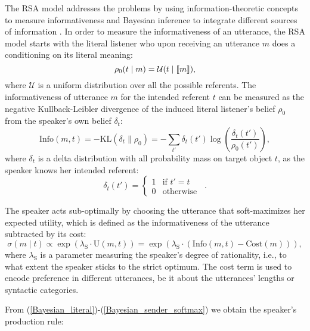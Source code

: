 The RSA model addresses the problems by using information-theoretic
concepts to measure informativeness and Bayesian inference to
integrate different sources of information
\cite{Frank2009,Frank,Bergen2012,GoodmanStuhlmuller2013:Knowledge-and-I}. In
order to measure the informativeness of an utterance, the RSA model
starts with the literal listener who upon receiving an utterance $m$
does a conditioning on its literal meaning:
\begin{equation}\label{Bayesian_literal}
\rho_0(t \mid m) = \mathcal{U}(t\mid \llbracket m \rrbracket) ,
\end{equation}
where $\mathcal{U}$ is a uniform distribution over all the possible
referents. The informativeness of utterance $m$ for the intended
referent $t$ can be measured as the negative Kullback-Leibler
divergence of the induced literal listener's belief $\rho_0$ from the
speaker's own belief $\delta_t$:
\begin{equation} \label{Bayesian_sender_informativeness}
\mbox{Info}(m,t)=-\mbox{KL}(\delta_t \| \rho_0)=-\sum_{t'}\delta_t(t')\log\left(\frac{\delta_t(t')}{\rho_0(t')}\right),
\end{equation}
where $\delta_t$ is a delta distribution with all probability mass on
target object $t$, as the speaker knows her intended referent:
\begin{equation} \label{Bayesian_sender_delta}
\delta_t(t')=\left\{ \begin{array}{ll}
1 & \mbox{if } t' = t \\
0 & \mbox{otherwise}
\end{array}\right. \enspace .
\end{equation}

The speaker acts sub-optimally by choosing the utterance that soft-maximizes her expected utility, which is defined as the informativeness of the utterance subtracted by its cost:
\begin{equation} \label{Bayesian_sender_softmax}
\sigma(m \mid t) \propto \exp(\lambda_\mathrm{S}\cdot \mbox{U}(m,t))=\exp(\lambda_\mathrm{S} \cdot (\mbox{Info}(m,t)-\mbox{Cost}(m))),
\end{equation}
where $\lambda_\mathrm{S}$ is a parameter measuring the speaker's
degree of rationality, i.e., to what extent the speaker sticks to the
strict optimum. The cost term is used to encode preference in
different utterances, be it about the utterances' lengths or syntactic
categories.

From (\ref{Bayesian_literal})-(\ref{Bayesian_sender_softmax}) we obtain the speaker's production rule:

